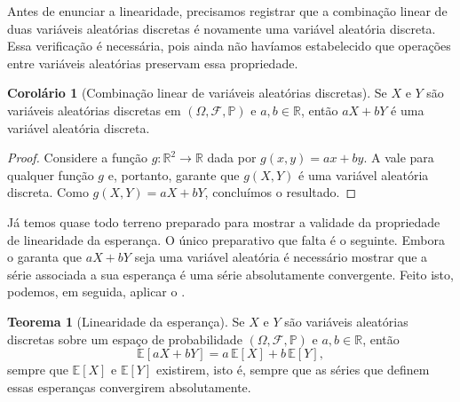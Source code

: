 \documentclass[12pt,portuguese]{article}
\theoremstyle{definition}
\newtheorem{theorem}{Teorema}
\newtheorem{corollary}[corollary]{Corolário}
\begin{document}
Antes de enunciar a linearidade, precisamos registrar que a combinação linear
de duas variáveis aleatórias discretas é novamente uma variável aleatória
discreta. Essa verificação é necessária, pois ainda não havíamos estabelecido
que operações entre variáveis aleatórias preservam essa propriedade.

\begin{corollary}[Combinação linear de variáveis aleatórias discretas]
\label{cor:combinacao-linear-va}
Se $X$ e $Y$ são variáveis aleatórias discretas em
$(\Omega,\mathcal{F},\mathbb{P})$ e $a,b\in\mathbb{R}$, então
$aX+bY$ é uma variável aleatória discreta.
\end{corollary}

\begin{proof}
Considere a função $g:\mathbb{R}^2\to\mathbb{R}$ dada por
$g(x,y)=ax+by$. A  vale para qualquer
função $g$ e, portanto, garante que $g(X,Y)$ é uma variável aleatória
discreta. Como $g(X,Y)=aX+bY$, concluímos o resultado.
\end{proof}

Já temos quase todo terreno preparado para mostrar a 
validade da propriedade de linearidade da esperança. 
O único preparativo que falta é o seguinte.
Embora o  garanta que 
$aX+bY$ seja uma variável aleatória é necessário mostrar 
que a série associada a sua esperança é uma série absolutamente convergente. 
Feito isto, podemos, em seguida, aplicar o .

\begin{theorem}[Linearidade da esperança]\label{thm:linearidade-esperanca}
Se $X$ e $Y$ são variáveis aleatórias discretas sobre um espaço de probabilidade 
$(\Omega,\mathcal{F},\mathbb{P})$ e $a,b\in\mathbb{R}$, então
\begin{equation}\label{eq:linearidade-esperanca}
  \mathbb{E}[aX+bY] = a\,\mathbb{E}[X] + b\,\mathbb{E}[Y],
\end{equation}
sempre que $\mathbb{E}[X]$ e $\mathbb{E}[Y]$ existirem, isto é, sempre que as
séries que definem essas esperanças convergirem absolutamente.
\end{theorem}
\end{document}
